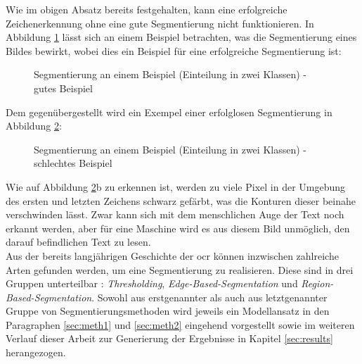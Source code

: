 		Wie im obigen Absatz bereits festgehalten, kann eine erfolgreiche Zeichenerkennung ohne eine gute Segmentierung nicht funktionieren. In Abbildung \ref{fig:seg-example-good} lässt sich an einem Beispiel betrachten, was die Segmentierung eines Bildes bewirkt, wobei dies ein Beispiel für eine erfolgreiche Segmentierung ist:
		\begin{figure}[H]
			\centering
			\qquad
			\caption{Segmentierung an einem Beispiel (Einteilung in zwei Klassen) - gutes Beispiel}
			\label{fig:seg-example-good}
		\end{figure}
		Dem gegenübergestellt wird ein Exempel einer erfolglosen Segmentierung in Abbildung \ref{fig:seg-example-bad}:
		\begin{figure}[H]
			\centering
			\qquad
			\caption{Segmentierung an einem Beispiel (Einteilung in zwei Klassen) - schlechtes Beispiel}
			\label{fig:seg-example-bad}
		\end{figure}
		Wie auf Abbildung \ref{fig:seg-example-bad}b zu erkennen ist, werden zu viele Pixel in der Umgebung des ersten und letzten Zeichens schwarz gefärbt, was die Konturen dieser beinahe verschwinden lässt. Zwar kann sich mit dem menschlichen Auge der Text noch erkannt werden, aber für eine Maschine wird es aus diesem Bild unmöglich, den darauf befindlichen Text zu lesen.\\
		Aus der bereits langjährigen Geschichte der \gls{ocr} können inzwischen zahlreiche Arten gefunden werden, um eine Segmentierung zu realisieren. Diese sind in drei Gruppen unterteilbar \cite[Kapitel 10]{gonzalez-woods}: \textit{Thresholding}, \textit{Edge-Based-Segmentation} und \textit{Region-Based-Segmentation}. Sowohl aus erstgenannter als auch aus letztgenannter Gruppe von Segmentierungsmethoden wird jeweils ein Modellansatz in den Paragraphen \ref{sec:meth1} und \ref{sec:meth2} eingehend vorgestellt sowie im weiteren Verlauf dieser Arbeit zur Generierung der Ergebnisse in Kapitel \ref{sec:results} herangezogen. \\
		
